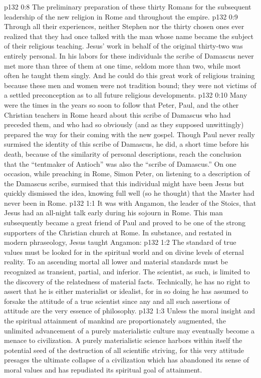 \vs p132 0:8 \bibnobreakspace The preliminary preparation of these thirty Romans for the subsequent leadership of the new religion in Rome and throughout the empire.
\pc \vs p132 0:9 Through all their experiences, neither Stephen nor the thirty chosen ones ever realized that they had once talked with the man whose name became the subject of their religious teaching. Jesus’ work in behalf of the original thirty\hyp{}two was entirely personal. In his labors for these individuals the scribe of Damascus never met more than three of them at one time, seldom more than two, while most often he taught them singly. And he could do this great work of religious training because these men and women were not tradition bound; they were not victims of a settled preconception as to all future religious developments.
\vs p132 0:10 Many were the times in the years so soon to follow that Peter, Paul, and the other Christian teachers in Rome heard about this scribe of Damascus who had preceded them, and who had so obviously (and as they supposed unwittingly) prepared the way for their coming with the new gospel. Though Paul never really surmised the identity of this scribe of Damascus, he did, a short time before his death, because of the similarity of personal descriptions, reach the conclusion that the “tentmaker of Antioch” was also the “scribe of Damascus.” On one occasion, while preaching in Rome, Simon Peter, on listening to a description of the Damascus scribe, surmised that this individual might have been Jesus but quickly dismissed the idea, knowing full well (so he thought) that the Master had never been in Rome.\plusone
{}
\vs p132 1:1 It was with Angamon, the leader of the Stoics, that Jesus had an all\hyp{}night talk early during his sojourn in Rome. This man subsequently became a great friend of Paul and proved to be one of the strong supporters of the Christian church at Rome. In substance, and restated in modern phraseology, Jesus taught Angamon:
\pc \vs p132 1:2 The standard of true values must be looked for in the spiritual world and on divine levels of eternal reality. To an ascending mortal all lower and material standards must be recognized as transient, partial, and inferior. The scientist, as such, is limited to the discovery of the relatedness of material facts. Technically, he has no right to assert that he is either materialist or idealist, for in so doing he has assumed to forsake the attitude of a true scientist since any and all such assertions of attitude are the very essence of philosophy.
\vs p132 1:3 Unless the moral insight and the spiritual attainment of mankind are proportionately augmented, the unlimited advancement of a purely materialistic culture may eventually become a menace to civilization. A purely materialistic science harbors within itself the potential seed of the destruction of all scientific striving, for this very attitude presages the ultimate collapse of a civilization which has abandoned its sense of moral values and has repudiated its spiritual goal of attainment.
